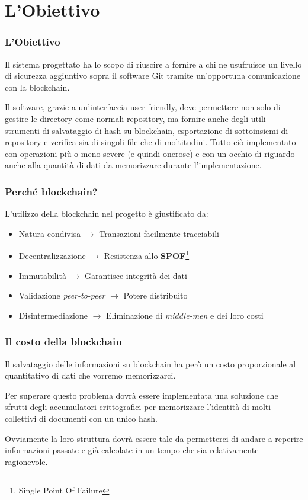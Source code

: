 \documentclass{beamer}
\begin{document}
\section{L'Obiettivo}
\begin{frame}
	\frametitle{L'Obiettivo}
	Il sistema progettato ha lo scopo di riuscire a fornire a chi ne usufruisce
	un livello di sicurezza aggiuntivo sopra il software Git tramite un'opportuna
	comunicazione con la blockchain.

	Il software, grazie a un'interfaccia user-friendly, deve permettere non solo di gestire
	le directory come normali repository, ma fornire
	anche degli utili strumenti di salvataggio di hash su blockchain,
	esportazione di sottoinsiemi di repository
	e verifica sia di singoli file che di moltitudini.
	Tutto ciò implementato con operazioni più o meno severe (e quindi onerose)
	e con un occhio di riguardo anche alla quantità di
	dati da memorizzare durante l'implementazione.
\end{frame}

\begin{frame}
	\frametitle{Perché blockchain?}
	L'utilizzo della blockchain nel progetto è giustificato da:
	\begin{itemize}[<+->]
		\item Natura condivisa \(\rightarrow\) Transazioni facilmente tracciabili
		\item Decentralizzazione \(\rightarrow\) Resistenza allo \textbf{SPOF}\footnote{Single Point Of Failure}
		\item Immutabilità \(\rightarrow\) Garantisce integrità dei dati
		\item Validazione \emph{peer-to-peer} \(\rightarrow\) Potere distribuito
		\item Disintermediazione \(\rightarrow\) Eliminazione di \emph{middle-men} e dei loro costi
	\end{itemize}
\end{frame}

\begin{frame}
	\frametitle{Il costo della blockchain}
	Il salvataggio delle informazioni su blockchain ha però un costo proporzionale al quantitativo
	di dati che vorremo memorizzarci.
	
	Per superare questo problema dovrà essere implementata una soluzione che sfrutti
	degli accumulatori crittografici per memorizzare l'identità di molti collettivi di documenti
	con un unico hash.

	Ovviamente la loro struttura dovrà essere tale da permetterci di andare a reperire
	informazioni passate e già calcolate in un tempo che sia relativamente ragionevole.
\end{frame}
\end{document}

